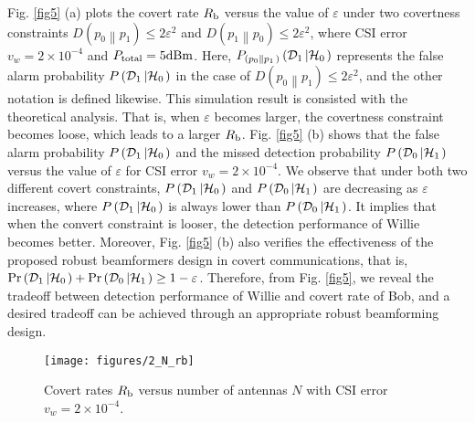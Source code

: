 \documentclass[10pt,journal,letterpaper,twocolumn,twoside]{IEEEtran} %
\begin{document}
 Fig. \ref{fig5} (a) plots the covert rate $R_{\rm{b}}$ versus the value of $\varepsilon$  under
 two covertness constraints $D\left( {{p_0}\left\| {{p_1}} \right.} \right) \le 2{\varepsilon ^2}$ and $D\left( {{p_1}\left\| {{p_0}} \right.} \right) \le 2{\varepsilon ^2}$,
  where CSI error   $v_w={2} \times {{10}}^{{- 4}}$ and ${P_{{\rm{total}}}}=5 \rm{dBm}$. Here, ${P_{\left( {{p_0}\left\| {{p_1}} \right.}\right)}} \left( {{{\cal D}_1}\left| {{{\cal H}_0}} \right.} \right)$ represents the false alarm probability $P \left( {{{\cal D}_1}\left| {{{\cal H}_0}} \right.} \right)$ in the case of $D\left( {{p_0}\left\| {{p_1}} \right.} \right) \le 2{\varepsilon ^2}$, and the other notation is defined likewise.
  This simulation result is consisted with the theoretical analysis. That is, when $\varepsilon$ becomes larger, the covertness constraint becomes loose, which leads to a larger $R_{\rm{b}}$.
   Fig. \ref{fig5} (b) shows that the false alarm probability $P \left( {{{\cal D}_1}\left| {{{\cal H}_0}} \right.} \right)$ and the missed detection probability $P \left( {{{\cal D}_0}\left| {{{\cal H}_1}} \right.} \right)$ versus the value of $\varepsilon$ for CSI error   $v_w={2} \times {{10}}^{{- 4}}$.
 We observe that  under both two different covert constraints,   $P \left( {{{\cal D}_1}\left| {{{\cal H}_0}} \right.} \right)$ and  $P \left( {{{\cal D}_0}\left| {{{\cal H}_1}} \right.} \right)$ are decreasing as    $\varepsilon$ increases, where $P \left( {{{\cal D}_1}\left| {{{\cal H}_0}} \right.} \right)$ is always lower than $P \left( {{{\cal D}_0}\left| {{{\cal H}_1}} \right.} \right)$.
It implies that when the convert constraint is looser, the detection performance of Willie becomes better.
  Moreover,   Fig. \ref{fig5} (b) also verifies    the effectiveness of the proposed robust beamformers design in covert communications, that is,
 $ \Pr \left( {{{\cal D}_1}\left| {{{\cal H}_0}} \right.} \right) + \Pr \left( {{{\cal D}_0}\left| {{{\cal H}_1}} \right.} \right) \ge 1 - \varepsilon$.
 Therefore, from Fig. \ref{fig5}, we reveal the tradeoff between  detection performance of Willie and  covert rate of Bob, and a desired tradeoff can be achieved through an appropriate robust beamforming design.

%
\begin{figure}[h]
      \centering
	\texttt{[image: figures/2\_N\_rb]}
 \caption{ Covert rates $R_{\rm{b}}$ versus  number of  antennas $N$  with CSI error   $v_w={2} \times {10}^{- 4}$.}
  \label{2_N_rb} %
\end{figure}
%
\end{document}
